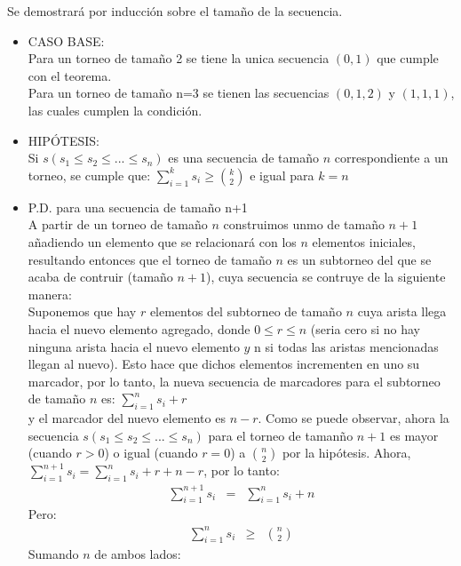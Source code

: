 \documentclass[9pt,spanish]{article}
\begin{document}
  
  Se demostrar\'a por inducci\'on sobre el tama\~no de la secuencia.\\
\begin{itemize}
	\item CASO BASE: \\
	Para un torneo de tama\~no 2 se tiene la unica secuencia $(0,1)$ que cumple con el teorema.\\
	Para un torneo de tama\~no n=3 se tienen las secuencias $(0,1,2)$ y $(1,1,1)$, las cuales cumplen la condici\'on. \\
	\item HIP\'OTESIS: \\ Si $s(s_1 \leq s_2 \leq ... \leq s_n)$ es una secuencia de tama\~no $n$ correspondiente a un torneo, se cumple que: $\displaystyle\sum_{i=1}^k s_i \geq {k \choose 2}$ e igual para $k=n$ 
	\item P.D. para una secuencia de tama\~no n+1 \\
	A partir de un torneo de tama\~no $n$ construimos unmo de tama\~no $n+1$ a\~nadiendo un elemento que se relacionar\'a con los $n$ elementos iniciales, resultando entonces que el torneo de tama\~no $n$ es un subtorneo del que se acaba de contruir (tama\~no $n+1$), cuya secuencia se contruye de la siguiente manera:\\
	Suponemos que hay $r$ elementos del subtorneo de tama\~no $n$ cuya arista llega hacia el nuevo elemento agregado, donde $0 \leq r \leq n$ (seria cero si no hay ninguna arista hacia el nuevo elemento  $y$ n si todas las aristas mencionadas llegan al nuevo). Esto hace que dichos elementos incrementen en uno su marcador, por lo tanto, la nueva secuencia de marcadores para el subtorneo de tama\~no $n$ es:
	 $\displaystyle\sum_{i=1}^n {s_i} + r$ \\
	 y el marcador del nuevo elemento es $n-r$.
	 Como se puede observar, ahora la secuencia  $s(s_1 \leq s_2 \leq ... \leq s_n)$ para el torneo de taman\~no $n+1$ es mayor (cuando $r>0$) o igual (cuando $r=0$) a ${n \choose 2}$ por la hip\'otesis.
	 Ahora,   $\displaystyle\sum_{i=1}^{n+1} s_i = \displaystyle\sum_{i=1}^n {s_i} + r + n - r$, por lo tanto:
	  \begin{eqnarray}
	  \label{eqn:smasuno}
	  \displaystyle\sum_{i=1}^{n+1} s_i &=& \displaystyle\sum_{i=1}^n {s_i} +  n
	  \end{eqnarray}
Pero:
	  \begin{eqnarray}
	  \displaystyle\sum_{i=1}^{n} s_i &\geq& {n \choose 2} \nonumber
	  \end{eqnarray}
Sumando $n$ de ambos lados:

\end{itemize}
\end{document}
